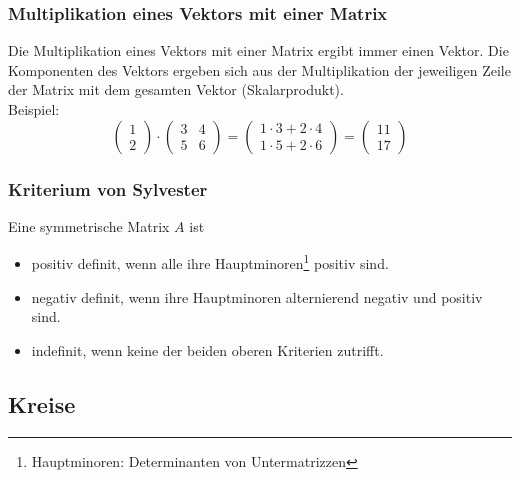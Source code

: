 \documentclass[a4paper,11pt]{article}
\begin{document}
	\subsubsection{Multiplikation eines Vektors mit einer Matrix}
	\label{ssub:multiplikation_eines_vektors_mit_einer_matrix}

	Die Multiplikation eines Vektors mit einer Matrix ergibt immer einen Vektor. Die Komponenten des Vektors ergeben sich
	aus der Multiplikation der jeweiligen Zeile der Matrix mit dem gesamten Vektor (Skalarprodukt).
	\\Beispiel:
	\begin{equation}
		\left(\begin{array}{c}1\\2\end{array}\right) \cdot \left(\begin{array}{cc}3 & 4\\5 & 6\end{array}\right)
		= \left(\begin{array}{c}1 \cdot 3 + 2 \cdot 4 \\ 1 \cdot 5 + 2 \cdot 6\end{array}\right)
		= \left(\begin{array}{c}11\\17\end{array}\right)
	\end{equation}
	
	\subsubsection{Kriterium von Sylvester}
	\label{ssub:kriterium_von_sylvester}
	
	Eine symmetrische Matrix $A$ ist 
	\begin{itemize}
		\item positiv definit, wenn alle ihre Hauptminoren\footnote{Hauptminoren: Determinanten von Untermatrizzen} positiv sind.
		\item negativ definit, wenn ihre Hauptminoren alternierend negativ und positiv sind.
		\item indefinit, wenn keine der beiden oberen Kriterien zutrifft.
	\end{itemize}
	
	
	\subsection{Kreise} %
	\label{sub:kreise}
	
\end{document}
